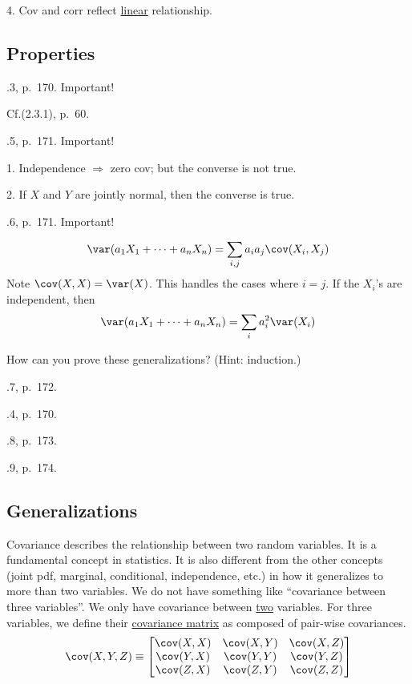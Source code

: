 \documentclass[12pt]{article}
\begin{document}
4. Cov and corr reflect \underline{linear} relationship.

\subsection{Properties}

.3, p.~170. Important!

Cf.\@ (2.3.1), p.~60.

.5, p.~171. Important!

\alert%
1. Independence $\Rightarrow$ zero cov;
but the converse is not true.

2. If $X$ and $Y$ are jointly normal, then
the converse is true.

.6, p.~171. Important!

\alert[Generalization]%
\[
\var(a_1X_1 + \dotsb + a_nX_n)
= \sum_{i,j} a_i a_j \cov(X_i, X_j)
\]
Note $\cov(X, X) = \var(X)$.
This handles the cases where $i=j$.
If the $X_i$'s are independent, then
\[
\var(a_1X_1 + \dotsb + a_nX_n)
= \sum_{i} a_i^2\var(X_i)
\]

How can you prove these generalizations?
(Hint: induction.)

.7, p.~172.

.4, p.~170.

.8, p.~173.

.9, p.~174.

\subsection{Generalizations}

Covariance describes the relationship between two random variables.
It is a fundamental concept in statistics.
It is also different from the other concepts (joint pdf, marginal,
conditional, independence, etc.) in how it generalizes to more than
two variables.
We do not have something like ``covariance between three variables''.
We only have covariance between \underline{two} variables.
For three variables, we define their \underline{covariance matrix}
as composed of pair-wise covariances.
\[
\cov(X, Y, Z)
\equiv \begin{bmatrix}
    \cov(X, X) & \cov(X,Y) & \cov(X,Z)\\
    \cov(Y, X) & \cov(Y,Y) & \cov(Y,Z)\\
    \cov(Z, X) & \cov(Z,Y) & \cov(Z,Z)
    \end{bmatrix}
\]
\end{document}
